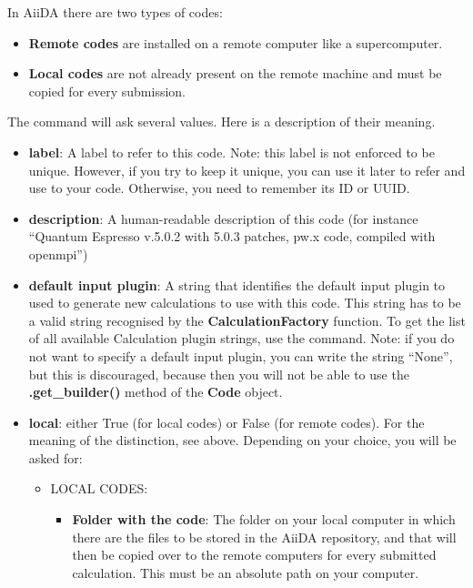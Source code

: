 \begin{appendices}
In AiiDA there are two types of codes:

\begin{itemize}
 \item \textbf{Remote codes} are installed on a remote computer like a supercomputer.
 \item \textbf{Local codes} are not already present on the remote machine and must be copied for every submission. 
\end{itemize}

The command  will ask several values. Here is a description of their meaning.

\begin{itemize}
\item {} 
\textbf{label}:  A label to refer to this code. Note: this label is not enforced
to be unique. However, if you try to keep it unique, you can use it later
to refer and use to your code. Otherwise, you need to remember its ID or UUID.

\item {} 
\textbf{description}: A human-readable description of this code (for instance ``Quantum
Espresso v.5.0.2 with 5.0.3 patches, pw.x code, compiled with openmpi'')

\item {} 
\textbf{default input plugin}: A string that identifies the default input plugin to
used to generate new calculations to use with this code.
This string has to be a valid string recognised by the \textbf{CalculationFactory}
function. To get the list of all available Calculation plugin strings,
use the  command. Note: if you do not want to
specify a default input plugin, you can write the string ``None'', but this is
discouraged, because then you will not be able to use
the \textbf{.get\_builder()} method of the \textbf{Code} object.

\item {} 
\textbf{local}: either True (for local codes) or False (for remote
codes). For the meaning of the distinction, see above. Depending
on your choice, you will be asked for:
\begin{itemize}
\item {} 
LOCAL CODES:
\begin{itemize}
\item {} 
\textbf{Folder with the code}: The folder on your local computer in which there
are the files to be stored in the AiiDA repository, and that will then be
copied over to the remote computers for every submitted calculation.
This must be an absolute path on your computer.


\end{itemize}
\end{itemize}
\end{itemize}
\end{appendices}
